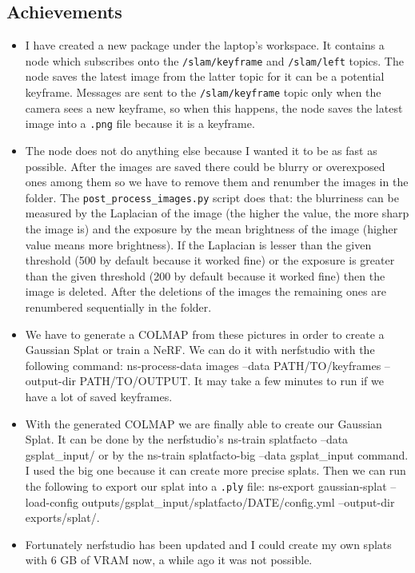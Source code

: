 \documentclass{article}
\begin{document}
\subsection{Achievements}
\begin{itemize}
    \item I have created a new package under the laptop's workspace. It contains a node which subscribes onto the \verb|/slam/keyframe| and \verb|/slam/left| topics. The node saves the latest image from the latter topic for it can be a potential keyframe. Messages are sent to the \verb|/slam/keyframe| topic only when the camera sees a new keyframe, so when this happens, the node saves the latest image into a \verb|.png| file because it is a keyframe.
    \item The node does not do anything else because I wanted it to be as fast as possible. After the images are saved there could be blurry or overexposed ones among them so we have to remove them and renumber the images in the folder. The \verb|post_process_images.py| script does that: the blurriness can be measured by the Laplacian of the image (the higher the value, the more sharp the image is) and the exposure by the mean brightness of the image (higher value means more brightness). If the Laplacian is lesser than the given threshold (500 by default because it worked fine) or the exposure is greater than the given threshold (200 by default because it worked fine) then the image is deleted. After the deletions of the images the remaining ones are renumbered sequentially in the folder.
    \item We have to generate a COLMAP from these pictures in order to create a Gaussian Splat or train a NeRF. We can do it with nerfstudio with the following command: ns-process-data images --data PATH/TO/keyframes --output-dir PATH/TO/OUTPUT. It may take a few minutes to run if we have a lot of saved keyframes.
    \item With the generated COLMAP we are finally able to create our Gaussian Splat. It can be done by the nerfstudio's ns-train splatfacto --data gsplat\_input/ or by the ns-train splatfacto-big --data gsplat\_input command. I used the big one because it can create more precise splats. Then we can run the following to export our splat into a \verb|.ply| file: ns-export gaussian-splat --load-config outputs/gsplat\_input/splatfacto/DATE/config.yml --output-dir exports/splat/.
    \item Fortunately nerfstudio has been updated and I could create my own splats with 6 GB of VRAM now, a while ago it was not possible.

\end{itemize}
\end{document}
